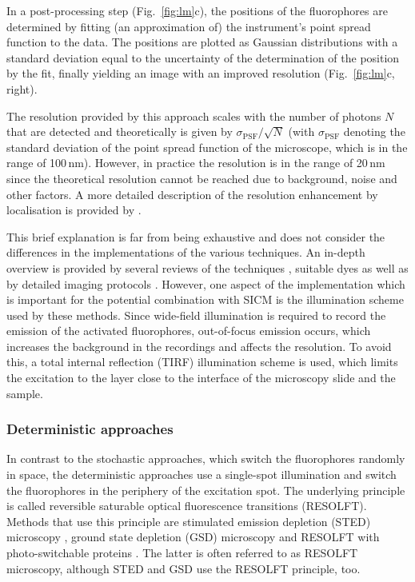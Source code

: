 In a post-processing step (Fig.~\ref{fig:lm}c), the positions of the
fluorophores are determined by fitting (an approximation of) the instrument's
point spread function to the data. The positions are plotted as Gaussian
distributions with a standard deviation equal to the uncertainty of the
determination of the position by the fit, finally yielding an image with an
improved resolution (Fig.~\ref{fig:lm}c, right).

The resolution provided by this approach scales with the number of photons $N$
that are detected and theoretically is given by $\sigma_\text{PSF}/\sqrt{N}$
(with $\sigma_\text{PSF}$ denoting the standard deviation of the point spread
function of the microscope, which is in the range of 100\,nm). However, in
practice the resolution is in the range of 20\,nm \cite{Betzig2006,Rust2006}
since the theoretical resolution cannot be reached due to background, noise
and other factors. A more detailed description of the resolution enhancement
by localisation is provided by \cite{Mortensen2010}. 

This brief explanation is far from being exhaustive and does not consider the
differences in the implementations of the various techniques. An in-depth
overview is provided by several reviews of the techniques
\cite{Patterson2010,Sengupta2014,Liu2015,Sauer2017}, suitable dyes
\cite{Li2018a} as well as by detailed imaging protocols
\cite{Gould2009,Schermelleh2010,Linde2011}. However, one aspect of the
implementation which is important for the potential combination with SICM is
the illumination scheme used by these methods. Since wide-field illumination
is required to record the emission of the activated fluorophores, out-of-focus
emission occurs, which increases the background in the recordings and affects
the resolution. To avoid this, a total internal reflection (TIRF) illumination
scheme \cite{AMBROSE1956,Axelrod1981} is used, which limits the excitation to
the layer close to the interface of the microscopy slide and the sample.   


\subsubsection{Deterministic approaches}
\label{sec:deterministic-approaches}
In contrast to the stochastic approaches, which switch the fluorophores
randomly in space, the deterministic approaches use a single-spot illumination
and switch the fluorophores in the periphery of the excitation spot. The
underlying principle is called reversible saturable optical fluorescence
transitions (RESOLFT). Methods that use this principle are stimulated emission
depletion (STED) microscopy \cite{hell+wichmann,Klar2000}, ground state
depletion (GSD) microscopy \cite{Hell1995,Bretschneider2007} and RESOLFT with
photo-switchable proteins \cite{Hofmann2005}. The latter is often referred to
as RESOLFT microscopy, although STED and GSD use the RESOLFT principle, too. 

